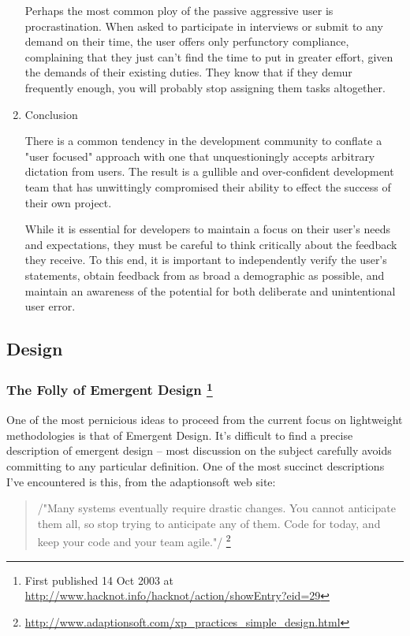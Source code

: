 \documentclass{article}
\begin{document}
\begin{enumerate}
Perhaps the most common ploy of the passive aggressive user is
procrastination. When asked to participate in interviews or submit to
any demand on their time, the user offers only perfunctory compliance,
complaining that they just can't find the time to put in greater effort,
given the demands of their existing duties. They know that if they demur
frequently enough, you will probably stop assigning them tasks
altogether.

\item Conclusion
\label{sec:orgheadline229}

There is a common tendency in the development community to conflate a
"user focused" approach with one that unquestioningly accepts arbitrary
dictation from users. The result is a gullible and over-confident
development team that has unwittingly compromised their ability to
effect the success of their own project.

While it is essential for developers to maintain a focus on their user's
needs and expectations, they must be careful to think critically about
the feedback they receive. To this end, it is important to independently
verify the user's statements, obtain feedback from as broad a
demographic as possible, and maintain an awareness of the potential for
both deliberate and unintentional user error.
\end{enumerate}

\subsection{Design}
\label{sec:orgheadline248}

\subsubsection{The Folly of Emergent Design \footnote{First published 14 Oct 2003 at
\url{http://www.hacknot.info/hacknot/action/showEntry?eid=29}}}
\label{sec:orgheadline236}

One of the most pernicious ideas to proceed from the current focus on
lightweight methodologies is that of Emergent Design. It's difficult to
find a precise description of emergent design -- most discussion on the
subject carefully avoids committing to any particular definition. One of
the most succinct descriptions I've encountered is this, from the
adaptionsoft web site:

\begin{quote}
/"Many systems eventually require drastic changes. You cannot
anticipate them all, so stop trying to anticipate any of them. Code
for today, and keep your code and your team agile."/ \footnote{\url{http://www.adaptionsoft.com/xp_practices_simple_design.html}}
\end{quote}
\end{document}
